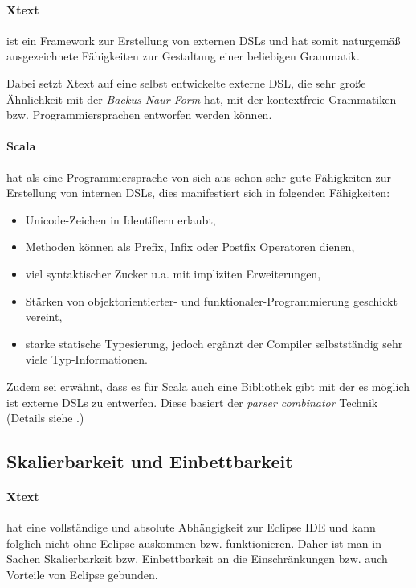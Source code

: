 \paragraph{Xtext} ist ein Framework zur Erstellung von externen DSLs und
hat somit naturgemäß ausgezeichnete Fähigkeiten zur Gestaltung einer beliebigen
Grammatik.

Dabei setzt Xtext auf eine selbst entwickelte externe DSL, die sehr große
Ähnlichkeit mit der \emph{Backus-Naur-Form} hat, mit der kontextfreie
Grammatiken bzw. Programmiersprachen entworfen werden können.

\paragraph{Scala} hat als eine Programmiersprache von sich aus schon
sehr gute Fähigkeiten zur Erstellung von internen DSLs, dies
manifestiert sich in folgenden Fähigkeiten:

\begin{itemize}
  \item Unicode-Zeichen in Identifiern erlaubt,
  \item Methoden können als Prefix, Infix oder Postfix Operatoren dienen,
  \item viel syntaktischer Zucker u.a. mit impliziten Erweiterungen,
  \item Stärken von objektorientierter- und funktionaler-Programmierung
        geschickt vereint,
  \item starke statische Typesierung, jedoch ergänzt der Compiler selbstständig
        sehr viele Typ-Informationen.
\end{itemize}

Zudem sei erwähnt, dass es für Scala auch eine Bibliothek gibt mit
der es möglich ist externe DSLs zu entwerfen. Diese basiert der
\emph{parser combinator} Technik (Details siehe \cite{dsls}.)


\subsection{Skalierbarkeit und Einbettbarkeit}\label{sec-scalierEinbett}

\paragraph{Xtext} hat eine vollständige und absolute Abhängigkeit
zur Eclipse IDE und kann folglich nicht ohne Eclipse auskommen bzw.
funktionieren. Daher ist man in Sachen Skalierbarkeit bzw. Einbettbarkeit
an die Einschränkungen bzw. auch Vorteile von Eclipse gebunden.

